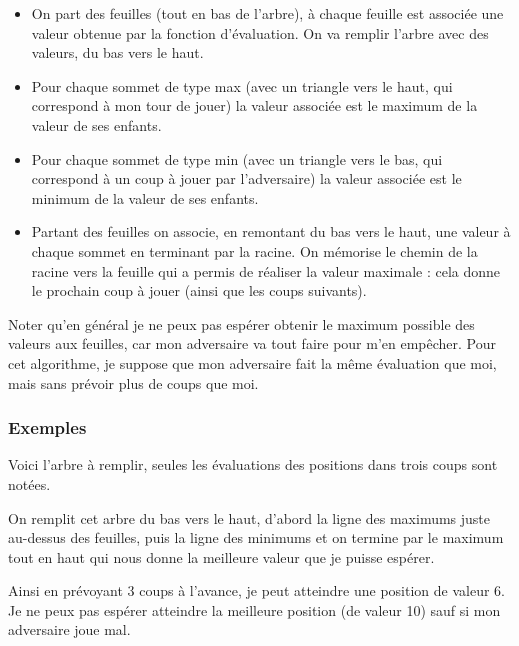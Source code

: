 \documentclass[11pt,class=report,crop=false]{standalone}
\begin{document}
\begin{itemize}
	\item On part des feuilles (tout en bas de l'arbre), à chaque feuille est associée une valeur obtenue par la fonction d'évaluation. On va remplir l'arbre avec des valeurs, du bas vers le haut. 
	
	\item Pour chaque sommet de type \og{}max\fg{} (avec un triangle vers le haut, qui correspond à mon tour de jouer) la valeur associée est le maximum de la valeur de ses enfants.
	
	\item Pour chaque sommet de type \og{}min\fg{} (avec un triangle vers le bas, qui correspond à un coup à jouer par l'adversaire) la valeur associée est le minimum de la valeur de ses enfants.
	
	\item Partant des feuilles on associe, en remontant du bas vers le haut, une valeur à chaque sommet en terminant par la racine. On mémorise le chemin de la racine vers la feuille qui a permis de réaliser la valeur maximale : cela donne le prochain coup à jouer (ainsi que les coups suivants).
	
\end{itemize}

Noter qu'en général je ne peux pas espérer obtenir le maximum possible des valeurs aux feuilles, car mon adversaire va tout faire pour m'en empêcher.
Pour cet algorithme, je suppose que mon adversaire fait la même évaluation que moi, mais sans prévoir plus de coups que moi.

\subsubsection{Exemples}

Voici l'arbre à remplir, seules les évaluations des positions dans trois coups sont notées.

On remplit cet arbre du bas vers le haut, d'abord la ligne des maximums juste au-dessus des feuilles, puis la ligne des minimums et on termine par le maximum tout en haut qui nous donne la meilleure valeur que je puisse espérer.


Ainsi en prévoyant 3 coups à l'avance, je peut atteindre une position de valeur 6. Je ne peux pas espérer atteindre la meilleure position (de valeur 10) sauf si mon adversaire joue mal.
\end{document}
